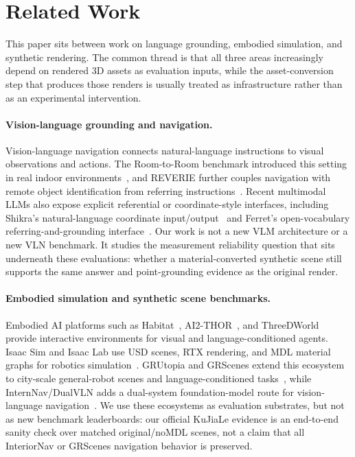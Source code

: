 \section{Related Work}
\label{sec:related_work}

This paper sits between work on language grounding, embodied simulation, and
synthetic rendering. The common thread is that all three areas increasingly
depend on rendered 3D assets as evaluation inputs, while the asset-conversion
step that produces those renders is usually treated as infrastructure rather
than as an experimental intervention.

\paragraph{Vision-language grounding and navigation.}
Vision-language navigation connects natural-language instructions to visual
observations and actions. The Room-to-Room benchmark introduced this setting in
real indoor environments~\cite{Anderson2018Vision}, and REVERIE further couples
navigation with remote object identification from referring
instructions~\cite{Qi2020REVERIE}. Recent multimodal LLMs also expose explicit
referential or coordinate-style interfaces, including Shikra's natural-language
coordinate input/output~\cite{Chen2023Shikra} and Ferret's open-vocabulary
referring-and-grounding interface~\cite{You2024Ferret}. Our work is not a new
VLM architecture or a new VLN benchmark. It studies the measurement reliability
question that sits underneath these evaluations: whether a material-converted
synthetic scene still supports the same answer and point-grounding evidence as
the original render.

\paragraph{Embodied simulation and synthetic scene benchmarks.}
Embodied AI platforms such as Habitat~\cite{Savva2019Habitat},
AI2-THOR~\cite{Kolve2017AI2THOR}, and ThreeDWorld~\cite{Gan2021ThreeDWorld}
provide interactive environments for visual and language-conditioned agents.
Isaac Sim and Isaac Lab use USD scenes, RTX rendering, and MDL material graphs
for robotics simulation~\cite{Mittal2023Orbit,Mittal2025Isaac}. GRUtopia and
GRScenes extend this ecosystem to city-scale general-robot scenes and
language-conditioned tasks~\cite{Wang2024GRUtopia}, while InternNav/DualVLN
adds a dual-system foundation-model route for vision-language
navigation~\cite{Wei2026Ground}. We use these ecosystems as evaluation
substrates, but not as new benchmark leaderboards: our official KuJiaLe
evidence is an end-to-end sanity check over matched original/noMDL scenes, not a
claim that all InteriorNav or GRScenes navigation behavior is preserved.

